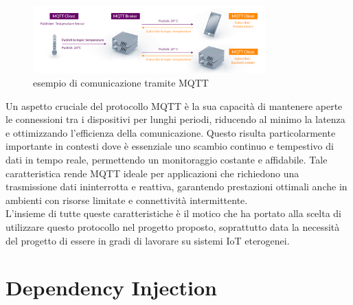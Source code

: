 \documentclass[12pt,a4paper,openright,twoside]{book}
\begin{document}
\begin{figure}[H]
    \centering
    \includegraphics[width=0.8\textwidth]{figures/mqtt-example.png}
    \caption{esempio di comunicazione tramite MQTT \cite{mqtt_publish_subscribe}}
    \label{fig:mqtt-example}
\end{figure}

Un aspetto cruciale del protocollo \ac{MQTT} è la sua capacità di mantenere aperte le connessioni tra i dispositivi per lunghi periodi, riducendo al minimo la latenza 
e ottimizzando l'efficienza della comunicazione. Questo risulta particolarmente importante in contesti dove è essenziale uno scambio continuo e tempestivo di dati 
in tempo reale, permettendo un monitoraggio costante e affidabile. Tale caratteristica rende \ac{MQTT} ideale per applicazioni che richiedono una trasmissione dati 
ininterrotta e reattiva, garantendo prestazioni ottimali anche in ambienti con risorse limitate e connettività intermittente.\\
L'insieme di tutte queste caratteristiche è il motico che ha portato alla scelta di utilizzare questo protocollo nel progetto proposto, 
soprattutto data la necessità del progetto di essere in gradi di lavorare su sistemi \ac{IoT} eterogenei.

\section{Dependency Injection}
\end{document}
